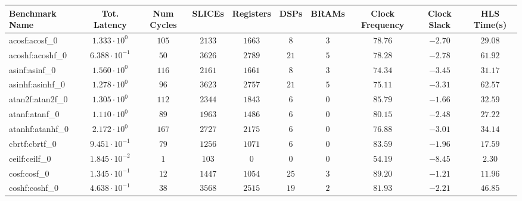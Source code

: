 \begin{tabular}{|l|c|c|c|c|c|c|c|c|c|}
\hline
Benchmark Name               & Tot. Latency            & Num Cycles & SLICEs    & Registers & DSPs    & BRAMs  & Clock Frequency & Clock Slack & HLS Time(s) \\
\hline
acosf:acosf\_0               & $ 1.333 \cdot 10^{0}  $ & $ 105    $ & $ 2133  $ & $ 1663  $ & $ 8   $ & $ 3  $ & $ 78.76       $ & $ -2.70   $ & $ 29.08   $ \\
acoshf:acoshf\_0             & $ 6.388 \cdot 10^{-1} $ & $ 50     $ & $ 3626  $ & $ 2789  $ & $ 21  $ & $ 5  $ & $ 78.28       $ & $ -2.78   $ & $ 61.92   $ \\
asinf:asinf\_0               & $ 1.560 \cdot 10^{0}  $ & $ 116    $ & $ 2161  $ & $ 1661  $ & $ 8   $ & $ 3  $ & $ 74.34       $ & $ -3.45   $ & $ 31.17   $ \\
asinhf:asinhf\_0             & $ 1.278 \cdot 10^{0}  $ & $ 96     $ & $ 3623  $ & $ 2757  $ & $ 21  $ & $ 5  $ & $ 75.11       $ & $ -3.31   $ & $ 62.57   $ \\
atan2f:atan2f\_0             & $ 1.305 \cdot 10^{0}  $ & $ 112    $ & $ 2344  $ & $ 1843  $ & $ 6   $ & $ 0  $ & $ 85.79       $ & $ -1.66   $ & $ 32.59   $ \\
atanf:atanf\_0               & $ 1.110 \cdot 10^{0}  $ & $ 89     $ & $ 1963  $ & $ 1486  $ & $ 6   $ & $ 0  $ & $ 80.15       $ & $ -2.48   $ & $ 27.22   $ \\
atanhf:atanhf\_0             & $ 2.172 \cdot 10^{0}  $ & $ 167    $ & $ 2727  $ & $ 2175  $ & $ 6   $ & $ 0  $ & $ 76.88       $ & $ -3.01   $ & $ 34.14   $ \\
cbrtf:cbrtf\_0               & $ 9.451 \cdot 10^{-1} $ & $ 79     $ & $ 1256  $ & $ 1071  $ & $ 6   $ & $ 0  $ & $ 83.59       $ & $ -1.96   $ & $ 17.59   $ \\
ceilf:ceilf\_0               & $ 1.845 \cdot 10^{-2} $ & $ 1      $ & $ 103   $ & $ 0     $ & $ 0   $ & $ 0  $ & $ 54.19       $ & $ -8.45   $ & $ 2.30    $ \\
cosf:cosf\_0                 & $ 1.345 \cdot 10^{-1} $ & $ 12     $ & $ 1447  $ & $ 1054  $ & $ 25  $ & $ 3  $ & $ 89.20       $ & $ -1.21   $ & $ 11.96   $ \\
coshf:coshf\_0               & $ 4.638 \cdot 10^{-1} $ & $ 38     $ & $ 3568  $ & $ 2515  $ & $ 19  $ & $ 2  $ & $ 81.93       $ & $ -2.21   $ & $ 46.85   $ \\

\end{tabular}
